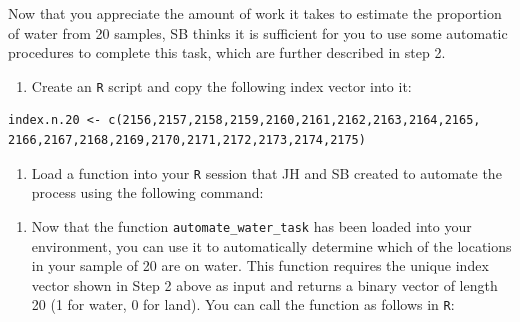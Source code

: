 \documentclass[letterpaper,10pt,twoside,]{pinp}
\providecommand{\tightlist}{%
  \setlength{\itemsep}{0pt}\setlength{\parskip}{0pt}}
\begin{document}
Now that you appreciate the amount of work it takes to estimate the
proportion of water from 20 samples, SB thinks it is sufficient for you
to use some automatic procedures to complete this task, which are
further described in step 2.

\begin{enumerate}
\def\labelenumi{\arabic{enumi}.}
\setcounter{enumi}{1}
\tightlist
\item
  Create an \texttt{R} script and copy the following index vector into
  it:
\end{enumerate}

\begin{ShadedResult}
\begin{verbatim}
index.n.20 <- c(2156,2157,2158,2159,2160,2161,2162,2163,2164,2165,
2166,2167,2168,2169,2170,2171,2172,2173,2174,2175)
\end{verbatim}
\end{ShadedResult}

\begin{enumerate}
\def\labelenumi{\arabic{enumi}.}
\setcounter{enumi}{2}
\tightlist
\item
  Load a function into your \texttt{R} session that JH and SB created to
  automate the process using the following command:
\end{enumerate}

\begin{Shaded}
\begin{Highlighting}[]
\NormalTok{(}\NormalTok{)}
\end{Highlighting}
\end{Shaded}

\begin{enumerate}
\def\labelenumi{\arabic{enumi}.}
\setcounter{enumi}{3}
\tightlist
\item
  Now that the function \texttt{automate\_water\_task} has been loaded
  into your environment, you can use it to automatically determine which
  of the locations in your sample of 20 are on water. This function
  requires the unique index vector shown in Step 2 above as input and
  returns a binary vector of length 20 (1 for water, 0 for land). You
  can call the function as follows in \texttt{R}:
\end{enumerate}

\begin{Shaded}
\begin{Highlighting}[]
\StringTok{ }\NormalTok{(}\NormalTok{)}
\end{Highlighting}
\end{Shaded}
\end{document}
